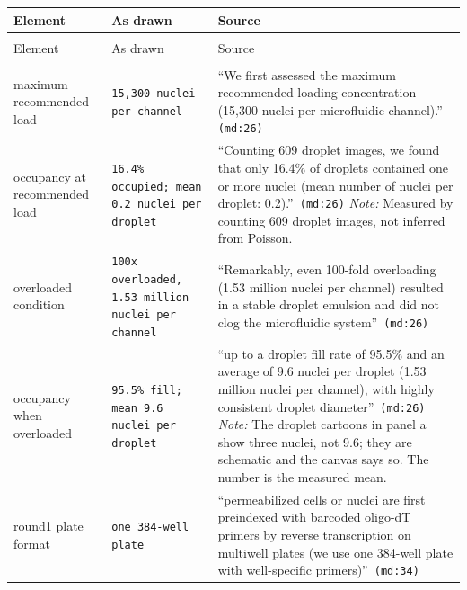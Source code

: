 \endgroup
\begin{longtable}{@{}>{\raggedright\arraybackslash}p{}@{\hspace{0.025\textwidth}}>{\raggedright\arraybackslash}p{}@{\hspace{0.025\textwidth}}>{\raggedright\arraybackslash}p{}@{}}
\toprule
Element & As drawn & Source \\
\midrule
\endfirsthead
\multicolumn{3}{@{}l}{\scriptsize\itshape Table~\ref{tab:prov-scifi-fluidic-indexing}, continued}\\
\toprule
Element & As drawn & Source \\
\midrule
\endhead
\bottomrule
\endlastfoot
\multicolumn{3}{@{}l}{\bfseries scifi-fluidic-indexing.drawio} \\*[1pt]
maximum recommended load & \texttt{15,300 nuclei per channel} & ``We first assessed the maximum recommended loading concentration (15,300 nuclei per microfluidic channel).'' \citep{datlingerUltrahighthroughputSinglecellRNA2021}\,\texttt{(md:26)} \\
\addlinespace[2.5pt]
occupancy at recommended load & \texttt{16.4\% occupied; mean 0.2 nuclei per droplet} & ``Counting 609 droplet images, we found that only 16.4\% of droplets contained one or more nuclei (mean number of nuclei per droplet: 0.2).'' \citep{datlingerUltrahighthroughputSinglecellRNA2021}\,\texttt{(md:26)} {\color{tcgray}\emph{Note:} Measured by counting 609 droplet images, not inferred from Poisson.} \\
\addlinespace[2.5pt]
overloaded condition & \texttt{100x overloaded, 1.53 million nuclei per channel} & ``Remarkably, even 100-fold overloading (1.53 million nuclei per channel) resulted in a stable droplet emulsion and did not clog the microfluidic system'' \citep{datlingerUltrahighthroughputSinglecellRNA2021}\,\texttt{(md:26)} \\
\addlinespace[2.5pt]
occupancy when overloaded & \texttt{95.5\% fill; mean 9.6 nuclei per droplet} & ``up to a droplet fill rate of 95.5\% and an average of 9.6 nuclei per droplet (1.53 million nuclei per channel), with highly consistent droplet diameter'' \citep{datlingerUltrahighthroughputSinglecellRNA2021}\,\texttt{(md:26)} {\color{tcgray}\emph{Note:} The droplet cartoons in panel a show three nuclei, not 9.6; they are schematic and the canvas says so. The number is the measured mean.} \\
\addlinespace[2.5pt]
round1 plate format & \texttt{one 384-well plate} & ``permeabilized cells or nuclei are first preindexed with barcoded oligo-dT primers by reverse transcription on multiwell plates (we use one 384-well plate with well-specific primers)'' \citep{datlingerUltrahighthroughputSinglecellRNA2021}\,\texttt{(md:34)} \\

\end{longtable}
